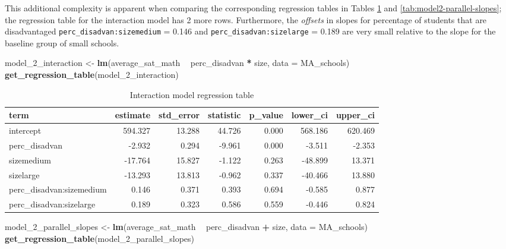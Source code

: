 \documentclass[12pt, krantz2,]{krantz}
\makeatletter
\newenvironment{Shaded}{\begin{snugshade}}{\end{snugshade}}
\newcommand{\DataTypeTok}[1]{\textcolor[rgb]{0.27,0.27,0.27}{#1}}
\newcommand{\DecValTok}[1]{\textcolor[rgb]{0.06,0.06,0.06}{#1}}
\newcommand{\KeywordTok}[1]{\textcolor[rgb]{0.27,0.27,0.27}{\textbf{#1}}}
\newcommand{\NormalTok}[1]{#1}
\newcommand{\OperatorTok}[1]{\textcolor[rgb]{0.43,0.43,0.43}{\textbf{#1}}}
\newcommand{\StringTok}[1]{\textcolor[rgb]{0.5,0.5,0.5}{#1}}
\newenvironment{kframe}{%
\medskip{}
\setlength{\fboxsep}{.8em}
 \def\at@end@of@kframe{}%
 \ifinner\ifhmode%
  \def\at@end@of@kframe{\end{minipage}}%
  \begin{minipage}{\columnwidth}%
 \fi\fi%
 \def\FrameCommand##1{\hskip\@totalleftmargin \hskip-\fboxsep
 \colorbox{shadecolor}{##1}\hskip-\fboxsep
     \hskip-\linewidth \hskip-\@totalleftmargin \hskip\columnwidth}%
 \MakeFramed {\advance\hsize-\width
   \@totalleftmargin\z@ \linewidth\hsize
   \@setminipage}}%
 {\par\unskip\endMakeFramed%
 \at@end@of@kframe}
\renewenvironment{Shaded}{\begin{kframe}}{\end{kframe}}
\makeatother
\begin{document}
This additional complexity is apparent when comparing the corresponding regression tables in Tables \ref{tab:model2-interaction} and \ref{tab:model2-parallel-slopes}; the regression table for the interaction model has 2 more rows. Furthermore, the \emph{offsets} in slopes for percentage of students that are disadvantaged \texttt{perc\_disadvan:sizemedium} = 0.146 and \texttt{perc\_disadvan:sizelarge} = 0.189 are very small relative to the slope for the baseline group of small schools.

\begin{Shaded}
\begin{Highlighting}[]
\NormalTok{model_}\DecValTok{2}\NormalTok{_interaction <-}\StringTok{ }\KeywordTok{lm}\NormalTok{(average_sat_math }\OperatorTok{~}\StringTok{ }\NormalTok{perc_disadvan }\OperatorTok{*}\StringTok{ }\NormalTok{size, }
                          \DataTypeTok{data =}\NormalTok{ MA_schools)}
\KeywordTok{get_regression_table}\NormalTok{(model_}\DecValTok{2}\NormalTok{_interaction)}
\end{Highlighting}
\end{Shaded}

\begin{table}[H]

\caption{\label{tab:model2-interaction}Interaction model regression table}
\centering
\fontsize{10}{12}\selectfont
\begin{tabular}{lrrrrrr}
\toprule
term & estimate & std\_error & statistic & p\_value & lower\_ci & upper\_ci\\
\midrule
intercept & 594.327 & 13.288 & 44.726 & 0.000 & 568.186 & 620.469\\
perc\_disadvan & -2.932 & 0.294 & -9.961 & 0.000 & -3.511 & -2.353\\
sizemedium & -17.764 & 15.827 & -1.122 & 0.263 & -48.899 & 13.371\\
sizelarge & -13.293 & 13.813 & -0.962 & 0.337 & -40.466 & 13.880\\
perc\_disadvan:sizemedium & 0.146 & 0.371 & 0.393 & 0.694 & -0.585 & 0.877\\
\addlinespace
perc\_disadvan:sizelarge & 0.189 & 0.323 & 0.586 & 0.559 & -0.446 & 0.824\\
\bottomrule
\end{tabular}
\end{table}

\begin{Shaded}
\begin{Highlighting}[]
\NormalTok{model_}\DecValTok{2}\NormalTok{_parallel_slopes <-}\StringTok{ }\KeywordTok{lm}\NormalTok{(average_sat_math }\OperatorTok{~}\StringTok{ }\NormalTok{perc_disadvan }\OperatorTok{+}\StringTok{ }\NormalTok{size, }
                              \DataTypeTok{data =}\NormalTok{ MA_schools)}
\KeywordTok{get_regression_table}\NormalTok{(model_}\DecValTok{2}\NormalTok{_parallel_slopes)}
\end{Highlighting}
\end{Shaded}
\end{document}
